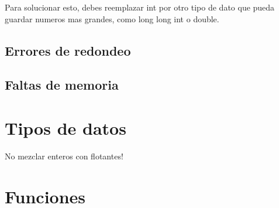 \documentclass{article}
\begin{document}
Para solucionar esto, debes reemplazar int por otro tipo de dato que pueda guardar numeros mas grandes, como long long int o double.

\subsection{Errores de redondeo}

\subsection{Faltas de memoria}

\section{Tipos de datos}

No mezclar enteros con flotantes!

\section{Funciones}
\end{document}
